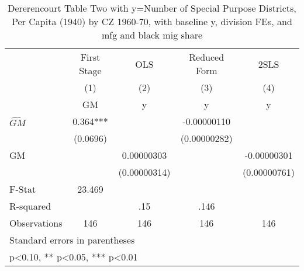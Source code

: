 \begin{table}[htbp]\centering
\def\sym#1{\ifmmode^{#1}\else\(^{#1}\)\fi}
\caption{Dererencourt Table Two with y=Number of Special Purpose Districts, Per Capita (1940) by CZ 1960-70, with baseline y, division FEs, and mfg and black mig share}
\begin{tabular}{l*{4}{c}}
\toprule
                    & First Stage   &         OLS   &Reduced Form   &        2SLS   \\
                    &\multicolumn{1}{c}{(1)}&\multicolumn{1}{c}{(2)}&\multicolumn{1}{c}{(3)}&\multicolumn{1}{c}{(4)}\\
                    &\multicolumn{1}{c}{GM}&\multicolumn{1}{c}{y}&\multicolumn{1}{c}{y}&\multicolumn{1}{c}{y}\\
\midrule
$\hat{GM}$          &       0.364***&               & -0.00000110   &               \\
                    &    (0.0696)   &               &(0.00000282)   &               \\
\addlinespace
GM                  &               &  0.00000303   &               & -0.00000301   \\
                    &               &(0.00000314)   &               &(0.00000761)   \\
\midrule
F-Stat              &      23.469   &               &               &               \\
R-squared           &               &         .15   &        .146   &               \\
Observations        &         146   &         146   &         146   &         146   \\
\bottomrule
\multicolumn{5}{l}{\footnotesize Standard errors in parentheses}\\
\multicolumn{5}{l}{\footnotesize * p<0.10, ** p<0.05, *** p<0.01}\\
\end{tabular}
\end{table}
